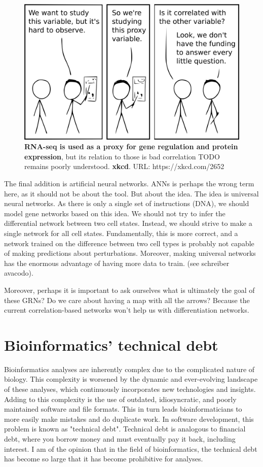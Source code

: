 \begin{figure}[H]
    \includegraphics[width=\linewidth]{ch.discussion/imgs/xkcd_proxy.png}
    \caption{\textbf{RNA-seq is used as a proxy for gene regulation and protein expression}, but its relation to those is bad correlation TODO remains poorly understood. \textbf{xkcd}. URL: https://xkcd.com/2652}
    \label{fig:xkcd_proxy}
\end{figure}
The final addition is artificial neural networks. ANNs is perhaps the wrong term here, as it should not be about the tool. But about the idea. The idea is universal neural networks. As there is only a single set of instructions (DNA), we should model gene networks based on this idea. We should not try to infer the differential network between two cell states. Instead, we should strive to make a single network for all cell states. Fundamentally, this is more correct, and a network trained on the difference between two cell types is probably not capable of making predictions about perturbations. Moreover, making universal networks has the enormous advantage of having more data to train. (see schreiber avacodo).

Moreover, perhaps it is important to ask ourselves what is ultimately the goal of these GRNs? Do we care about having a map with all the arrows? Because the current correlation-based networks won't help us with differentiation networks. 

\section{Bioinformatics' technical debt}

Bioinformatics analyses are inherently complex due to the complicated nature of biology. This complexity is worsened by the dynamic and ever-evolving landscape of these analyses, which continuously incorporates new technologies and insights. Adding to this complexity is the use of outdated, idiosyncratic, and poorly maintained software and file formats. This in turn leads bioinformaticians to more easily make mistakes and do duplicate work. In software development, this problem is known as "technical debt". Technical debt is analogous to financial debt, where you borrow money and must eventually pay it back, including interest. I am of the opinion that in the field of bioinformatics, the technical debt has become so large that it has become prohibitive for analyses.


